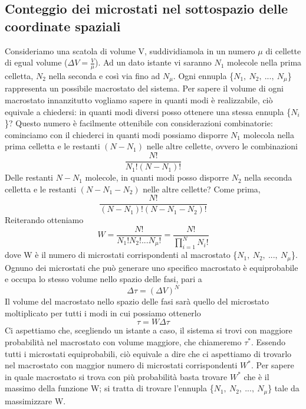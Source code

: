 \documentclass[10pt,a4paper]{article}
\begin{document}
\subsection{Conteggio dei microstati nel sottospazio delle coordinate spaziali}
Consideriamo una scatola di volume V, suddividiamola in un numero $\mu$ di cellette di egual volume (\(\Delta V = \frac{V}{\mu}\)). Ad un dato istante vi saranno \(N_1\) molecole nella prima celletta, \(N_2\) nella seconda e così via fino ad $N_{\mu}$. Ogni ennupla  \{\(N_1,\ N_2,\ ...,\ N_\mu\)\} rappresenta un possibile macrostato del sistema. Per sapere il volume di ogni macrostato innanzitutto vogliamo sapere in quanti modi è realizzabile, ciò equivale a chiedersi: in quanti modi diversi posso ottenere una stessa ennupla \{\(N_i\)\}? Questo numero è facilmente ottenibile con considerazioni combinatorie: cominciamo con il chiederci in quanti modi possiamo disporre \(N_1\) molecola nella prima celletta e le restanti \((N-N_1)\) nelle altre cellette, ovvero le combinazioni
\[\frac{N!}{N_1!(N-N_1)!}\]
Delle restanti \(N-N_1\) molecole, in quanti modi posso disporre \(N_2\) nella seconda celletta e le restanti \((N-N_1-N_2)\) nelle altre cellette? Come prima,
\[\frac{N!}{(N-N_1)!(N-N_1-N_2)!}\] 
Reiterando otteniamo
\[W=\frac{N!}{N_1!N_2!...N_\mu!}=\frac{N!}{\prod_{i=1}^{N}N_i!}\]
dove W è il numero di microstati corrispondenti al macrostato \{\(N_1,\ N_2,\ ...,\ N_\mu\)\}. Ognuno dei microstati che può generare uno specifico macrostato è equiprobabile e occupa lo stesso volume nello spazio delle fasi, pari a 
\[\Delta\tau = (\Delta V)^N\]
Il volume del macrostato nello spazio delle fasi sarà quello del microstato moltiplicato per tutti i  modi in cui possiamo ottenerlo
\[\tau = W \Delta \tau\]
Ci aspettiamo che, scegliendo un istante a caso, il sistema si trovi con maggiore probabilità nel macrostato con volume maggiore, che chiameremo $\tau^*$. Essendo tutti i microstati equiprobabili, ciò equivale a dire che ci aspettiamo di trovarlo nel macrostato con maggior numero di microstati corrispondenti \(W^*\). Per sapere in quale macrostato si trova con più probabilità basta trovare \(W^*\) che è il massimo della funzione W; si tratta di trovare l'ennupla \{\(N_1,\ N_2,\ ...,\  N_{\mu}\)\} tale da massimizzare W.
\end{document}
